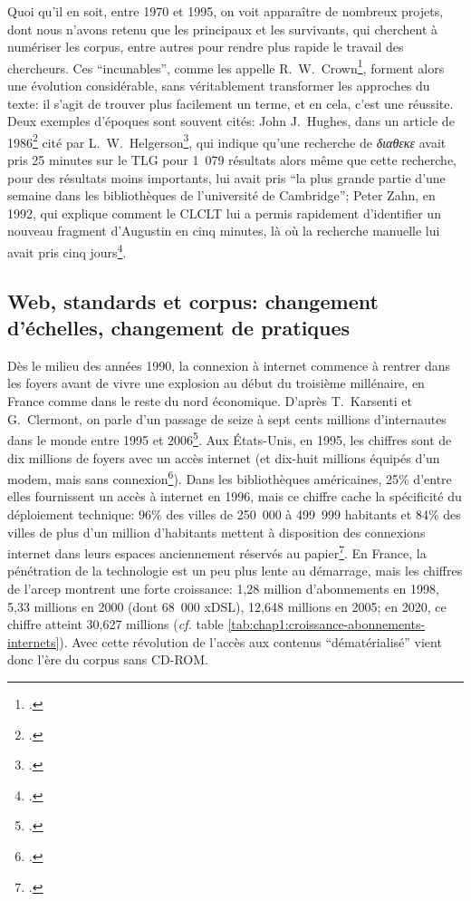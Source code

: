 Quoi qu'il en soit, entre 1970 et 1995, on voit apparaître de nombreux projets, dont nous n'avons retenu que les principaux et les survivants, qui cherchent à numériser les corpus, entre autres pour rendre plus rapide le travail des chercheurs. Ces \enquote{incunables}, comme les appelle R.~W.~Crown\footcite[p.~107]{crown_comparing_2000}, forment alors une évolution considérable, sans véritablement transformer les approches du texte: il s'agit de trouver plus facilement un terme, et en cela, c'est une réussite. Deux exemples d'époques sont souvent cités: John J.~Hughes, dans un article de 1986\footcite{hughes_ibycus_1986} cité par L.~W.~Helgerson\footcite{helgerson_cd-rom_1988}, qui indique qu'une recherche de \textit{διαθεκε} avait pris 25 minutes sur le TLG pour 1~079 résultats alors même que cette recherche, pour des résultats moins importants, lui avait pris \enquote{la plus grande partie d'une semaine dans les bibliothèques de l'université de Cambridge}; Peter Zahn, en 1992, qui explique comment le CLCLT lui a permis rapidement d'identifier un nouveau fragment d'Augustin en cinq minutes, là où la recherche manuelle lui avait pris cinq jours\footcite[p. 427]{zahn_kirchenvater-texte_1992}.

\subsection{Web, standards et corpus: changement d'échelles, changement de pratiques}

Dès le milieu des années 1990, la connexion à internet commence à rentrer dans les foyers avant de vivre une explosion au début du troisième millénaire, en France comme dans le reste du nord économique. D'après T.~Karsenti et G.~Clermont, on parle d'un passage de seize à sept cents millions d'internautes dans le monde entre 1995 et 2006\footcite{karsenti_les_2006}. Aux États-Unis, en 1995, les chiffres sont de dix millions de foyers avec un accès internet (et dix-huit millions équipés d'un modem, mais sans connexion\footcite{nw_americans_1995}). Dans les bibliothèques américaines, 25\% d'entre elles fournissent un accès à internet en 1996, mais ce chiffre cache la spécificité du déploiement technique: 96\% des villes de 250~000 à 499~999 habitants et 84\% des villes de plus d'un million d'habitants mettent à disposition des connexions internet dans leurs espaces anciennement réservés au papier\footcite{zumalt_internet_1998}. En France, la pénétration de la technologie est un peu plus lente au démarrage, mais les chiffres de l'\acrfull{arcep} montrent une forte croissance: 1,28 million d'abonnements en 1998, 5,33 millions en 2000 (dont 68~000 xDSL), 12,648 millions en 2005; en 2020, ce chiffre atteint 30,627 millions (\textit{cf.} table \ref{tab:chap1:croissance-abonnements-internets}). Avec cette révolution de l'accès aux contenus \enquote{dématérialisé} vient donc l'ère du corpus sans CD-ROM.

